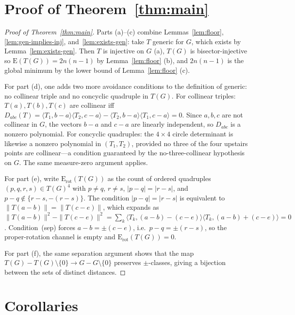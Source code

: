 \documentclass[12pt]{article}
\newcommand{\E}{\mathrm{E}}         %
\newcommand{\Erot}{\mathrm{E}_{\mathrm{rot}}} %
\newcommand{\ip}[2]{\langle #1,#2\rangle}
\newcommand{\norm}[1]{\|#1\|}
\begin{document}
\section{Proof of Theorem~\ref{thm:main}}

\begin{proof}[Proof of Theorem~\ref{thm:main}]
Parts (a)--(c) combine Lemmas~\ref{lem:floor}, \ref{lem:gen-implies-inj},
and~\ref{lem:exists-gen}: take $T$ generic for $G$, which exists by
Lemma~\ref{lem:exists-gen}.  Then $T$ is injective on $G$ (a), $T(G)$ is
bisector-injective so $\E(T(G))=2n(n-1)$ by Lemma~\ref{lem:floor} (b),
and $2n(n-1)$ is the global minimum by the lower bound of
Lemma~\ref{lem:floor} (c).

For part (d), one adds two more avoidance conditions to the definition of generic:
no collinear triple and no concyclic quadruple in $T(G)$.
For collinear triples: $T(a),T(b),T(c)$ are collinear iff
$D_{abc}(T)=\ip{T_1}{b-a}\ip{T_2}{c-a}-\ip{T_2}{b-a}\ip{T_1}{c-a}=0$.
Since $a,b,c$ are not collinear in $G$, the vectors $b-a$ and $c-a$ are linearly
independent, so $D_{abc}$ is a nonzero polynomial.
For concyclic quadruples: the $4\times 4$ circle determinant is likewise a nonzero
polynomial in $(T_1,T_2)$, provided no three of the four upstairs points are
collinear---a condition guaranteed by the no-three-collinear hypothesis on $G$.
The same measure-zero argument applies.

For part (e), write $\Erot(T(G))$ as the count of ordered quadruples
$(p,q,r,s)\in T(G)^4$ with $p\ne q$, $r\ne s$, $|p-q|=|r-s|$, and
$p-q\notin\{r-s,-(r-s)\}$.  The condition $|p-q|=|r-s|$ is equivalent to
$\norm{T(a-b)}=\norm{T(c-e)}$, which expands as
$\norm{T(a-b)}^2 - \norm{T(c-e)}^2
 = \sum_k \ip{T_k}{(a-b)-(c-e)}\ip{T_k}{(a-b)+(c-e)} = 0$.
Condition~(sep) forces $a-b=\pm(c-e)$,
i.e.\ $p-q=\pm(r-s)$, so the proper-rotation channel is empty and
$\Erot(T(G))=0$.

For part (f), the same separation argument shows that the map
$T(G)-T(G)\setminus\{0\}\to G-G\setminus\{0\}$ preserves $\pm$-classes,
giving a bijection between the sets of distinct distances.
\end{proof}

\section{Corollaries}
\end{document}
